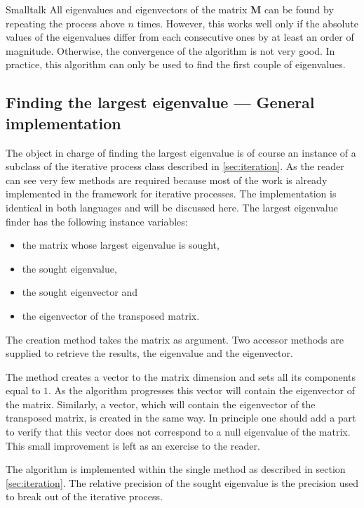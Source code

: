 \begin{displaycode}{Smalltalk}
All eigenvalues and eigenvectors of the matrix $\textbf{M}$ can be
found by repeating the process above $n$ times. However, this
works well only if the absolute values of the eigenvalues differ
from each consecutive ones by at least an order of magnitude.
Otherwise, the convergence of the algorithm is not very good. In
practice, this algorithm can only be used to find the first couple
of eigenvalues.

\subsection{Finding the largest eigenvalue --- General implementation}
The object in charge of finding the largest eigenvalue is of course an instance
of a subclass of the iterative process class described in
\ref{sec:iteration}. As the reader can see very few methods are
required because most of the work is already implemented in the
framework for iterative processes. The implementation is identical
in both languages and will be discussed here. The largest
eigenvalue finder has the following instance variables:
\begin{itemize}
  \item {} the matrix whose largest eigenvalue is sought,
  \item {} the sought eigenvalue,
  \item {} the sought eigenvector and
  \item {} the eigenvector of the
  transposed matrix.
\end{itemize}
The creation method takes the matrix as argument. Two accessor
methods are supplied to retrieve the results, the eigenvalue and
the eigenvector.

The method  creates a vector to the
matrix dimension and sets all its components equal to $1$.
As the algorithm progresses this vector will contain the eigenvector of
the matrix.
Similarly, a vector, which will contain the eigenvector of the transposed matrix, is created in the same way.
In principle one should add a part to verify that this vector does
not correspond to a null eigenvalue of the matrix.
This small improvement is left as an exercise to the reader.

The algorithm is implemented within the single method  as described in section \ref{sec:iteration}.
The relative precision of the sought eigenvalue is the precision
used to break out of the iterative process.


\end{displaycode}
